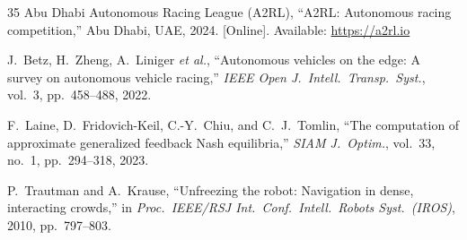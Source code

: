 \documentclass{iopjournal}
\begin{document}
\begin{thebibliography}{35}
Abu Dhabi Autonomous Racing League (A2RL),
``A2RL: Autonomous racing competition,'' Abu Dhabi, UAE, 2024.
[Online]. Available: \url{https://a2rl.io}

J.~Betz, H.~Zheng, A.~Liniger \emph{et al.}, ``Autonomous vehicles on the edge: A survey on autonomous vehicle racing,'' \emph{IEEE Open J.\ Intell.\ Transp.\ Syst.}, vol.~3, pp.~458--488, 2022.

F.~Laine, D.~Fridovich-Keil, C.-Y.~Chiu, and C.~J.~Tomlin, ``The computation of approximate generalized feedback Nash equilibria,'' \emph{SIAM J.\ Optim.}, vol.~33, no.~1, pp.~294--318, 2023.

P.~Trautman and A.~Krause, ``Unfreezing the robot: Navigation in dense, interacting crowds,'' in \emph{Proc.\ IEEE/RSJ Int.\ Conf.\ Intell.\ Robots Syst.\ (IROS)}, 2010, pp.~797--803.


\end{thebibliography}
\end{document}
